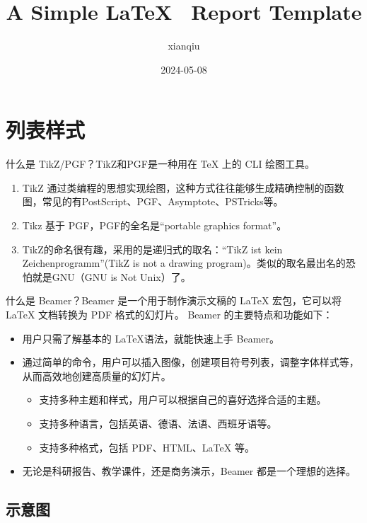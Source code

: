 \documentclass{cls/simplereport}
\begin{document}
\title{A Simple \LaTeX~ Report Template}
\author{xianqiu}
\date{2024-05-08}
\maketitle
	
\section{列表样式}
	
什么是 TikZ/PGF？TikZ和PGF是一种用在 TeX 上的 CLI 绘图工具。

\begin{enumerate}
	\item TikZ 通过类编程的思想实现绘图，这种方式往往能够生成精确控制的函数图，常见的有PostScript、PGF、Asymptote、PSTricks等。
	\item Tikz 基于 PGF，PGF的全名是“portable graphics format”。
	\item TikZ的命名很有趣，采用的是递归式的取名：“TikZ ist kein Zeichenprogramm”(TikZ is not a drawing program)。类似的取名最出名的恐怕就是GNU（GNU is Not Unix）了。
\end{enumerate}

什么是 Beamer？Beamer 是一个用于制作演示文稿的 LaTeX 宏包，它可以将 LaTeX 文档转换为 PDF 格式的幻灯片。
Beamer 的主要特点和功能如下：

\begin{itemize}
	\item 用户只需了解基本的 \LaTeX 语法，就能快速上手 Beamer。
	\item 通过简单的命令，用户可以插入图像，创建项目符号列表，调整字体样式等，从而高效地创建高质量的幻灯片。
	\begin{itemize}
		\item 支持多种主题和样式，用户可以根据自己的喜好选择合适的主题。
		\item 支持多种语言，包括英语、德语、法语、西班牙语等。
		\item 支持多种格式，包括 PDF、HTML、LaTeX 等。
	\end{itemize}
	\item 无论是科研报告、教学课件，还是商务演示，Beamer 都是一个理想的选择。
	\end{itemize}

\subsection{示意图}

\begin{figure}[ht]
	\centering
\end{figure}
\end{document}
